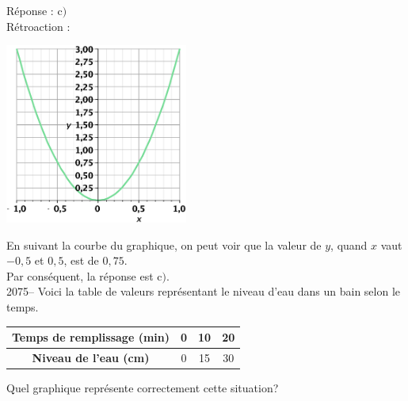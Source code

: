 \documentclass[letterpaper, 12pt]{article}
\begin{document}
R\'eponse : c$)$\\

R\'etroaction :\\
\begin{center}
 \includegraphics[width=6cm,bb=20 118 575 673]{Q2074v.eps}
\end{center}
En suivant la courbe du graphique, on peut voir que la valeur de $y$, quand $x$ vaut $-0,5$ et $0,5$, est de $0,75$.\\
Par cons\'equent, la r\'eponse est c$)$.\\

2075-- Voici la table de valeurs repr\'esentant le niveau d'eau dans un bain selon le temps.
\begin{center}
 \begin{tabular}{|c||c| c | c |} \hline
{\bf Temps de remplissage (min)} & 0 & 10 & 20 \\ \hline
{\bf Niveau de l'eau (cm) } & 0 & 15 & 30  \\ \hline
\end{tabular}
\end{center}
Quel graphique repr\'esente correctement cette situation?\\
\end{document}
